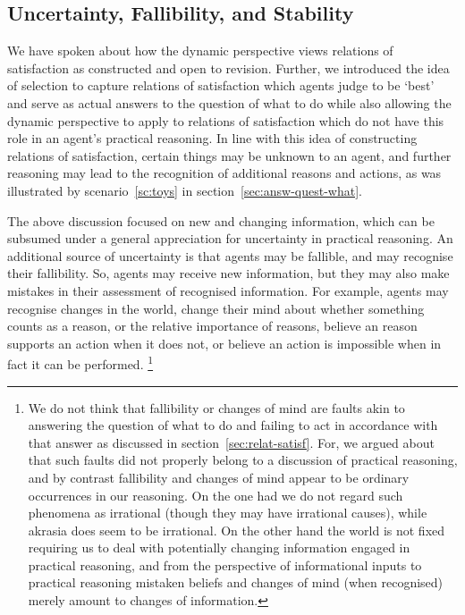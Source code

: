 \documentclass[10pt]{article}
\begin{document}
\subsection{Uncertainty, Fallibility, and Stability}
\label{sec:uncert-stab}

We have spoken about how the dynamic perspective views relations of satisfaction as constructed and open to revision.
Further, we introduced the idea of selection to capture relations of satisfaction which agents judge to be `best' and serve as actual answers to the question of what to do while also allowing the dynamic perspective to apply to relations of satisfaction which do not have this role in an agent's practical reasoning.
In line with this idea of constructing relations of satisfaction, certain things may be unknown to an agent, and further reasoning may lead to the recognition of additional reasons and actions, as was illustrated by scenario~\ref{sc:toys} in section~\ref{sec:answ-quest-what}.

The above discussion focused on new and changing information, which can be subsumed under a general appreciation for uncertainty in practical reasoning.
An additional source of uncertainty is that agents may be fallible, and may recognise their fallibility.
So, agents may receive new information, but they may also make mistakes in their assessment of recognised information.
For example, agents may recognise changes in the world, change their mind about whether something counts as a reason, or the relative importance of reasons, believe an reason supports an action when it does not, or believe an action is impossible when in fact it can be performed.\nolinebreak
\footnote{We do not think that fallibility or changes of mind are faults akin to answering the question of what to do and failing to act in accordance with that answer as discussed in section~\ref{sec:relat-satisf}.
For, we argued about that such faults did not properly belong to a discussion of practical reasoning, and by contrast fallibility and changes of mind appear to be ordinary occurrences in our reasoning.
On the one had we do not regard such phenomena as irrational (though they may have irrational causes), while akrasia does seem to be irrational.
On the other hand the world is not fixed requiring us to deal with potentially changing information engaged in practical reasoning, and from the perspective of informational inputs to practical reasoning mistaken beliefs and changes of mind (when recognised) merely amount to changes of information.}
\end{document}
